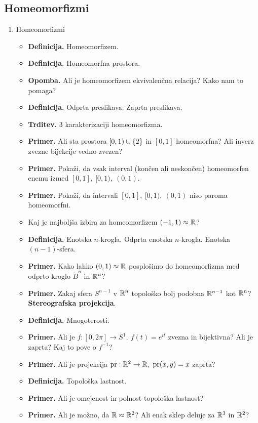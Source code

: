 \subsection{Homeomorfizmi}
\begin{enumerate}
    \item Homeomorfizmi
    \begin{itemize}
        \item \textbf{Definicija.} Homeomorfizem.
        \item \textbf{Definicija.} Homeomorfna prostora.
        \item \textbf{Opomba.} Ali je homeomorfizem ekvivalenčna relacija? Kako nam to pomaga?
        \item \textbf{Definicija.} Odprta preslikava. Zaprta preslikava.
        \item \textbf{Trditev.} 3 karakterizaciji homeomorfizma.
        \item \textbf{Primer.} Ali sta prostora $[0, 1) \cup \{2\}$ in $[0,1]$ homeomorfna? Ali inverz zvezne bijekcije vedno zvezen?
        \item \textbf{Primer.} Pokaži, da vsak interval (končen ali neskončen) homeomorfen enemu izmed $[0,1], \ [0, 1), \ (0,1)$.
        \item \textbf{Primer.} Pokaži, da intervali $[0,1], \ [0, 1), \ (0,1)$ niso paroma homeomorfni.
        \item Kaj je najboljša izbira za homeomorfizem $(-1, 1) \approx \mathbb{R}$?
        \item \textbf{Definicija.} Enotska $n$-krogla. Odprta enotska $n$-krogla. Enotska $(n-1)$-sfera.
        \item \textbf{Primer.} Kako lahko $(0, 1) \approx \mathbb{R}$ posplošimo do homeomorfizma med odprto kroglo $\mathring{B}^n$ in $\mathbb{R}^n$?
        \item \textbf{Primer.} Zakaj sfera $S^{n-1}$ v $\mathbb{R}^n$ topološko bolj podobna $\mathbb{R}^{n-1}$ kot $\mathbb{R}^n$? \textbf{Stereografska projekcija}.
        \item \textbf{Definicija.} Mnogoterosti.
        \item \textbf{Primer.}  Ali je $f: [0, 2 \pi] \to S^1, \ f(t) = e^{it}$ zvezna in bijektivna? Ali je zaprta? Kaj to pove o $f^{-1}$?
        \item \textbf{Primer.} Ali je projekcija $\operatorname{pr}: \mathbb{R}^2 \to \mathbb{R}, \ \operatorname{pr}(x,y) = x$ zaprta?
        \item \textbf{Definicija.} Topološka lastnost.
        \item \textbf{Primer.} Ali je omejenost in polnost topološka lastnost?
        \item \textbf{Primer.} Ali je možno, da $\mathbb{R} \approx \mathbb{R}^2$? Ali enak sklep deluje za $\mathbb{R}^3$ in $\mathbb{R}^2$?
    \end{itemize}
\end{enumerate}

